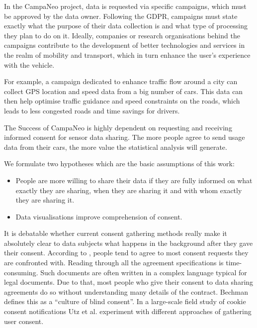 \documentclass[../paper.tex]{subfiles}
\begin{document}
  In the CampaNeo project, data is requested via specific campaigns, which must be
  approved by the data owner. Following the GDPR, campaigns must state exactly
  what the purpose of their data collection is and what type of processing they
  plan to do on it. Ideally, companies or research organisations behind the
  campaigns contribute to the development of better technologies and services
  in the realm of mobility and transport, which in turn enhance the user’s
  experience with the vehicle.

  For example, a campaign dedicated to enhance traffic flow around a city can collect
  GPS location and speed data from a big number of cars. This data can then help
  optimise traffic guidance and speed constraints on the roads, which leads to less congested roads and
  time savings for drivers.
  
  The Success of CampaNeo is highly dependent on requesting and receiving informed
  consent for sensor data sharing. The more people agree to send usage data from
  their cars, the more value the statistical analysis will generate. 
  
  We
  formulate two hypotheses which are the basic assumptions of this work:
  
  \begin{itemize}
    \item People are more willing to share their data if they are fully informed
          on what exactly they are sharing, when they are sharing it and with
          whom exactly they are sharing it.
    \item Data visualisations improve comprehension of consent.
  \end{itemize}

  It is debatable whether current consent gathering methods really make it
  absolutely clear to data subjects what happens in the background after they
  gave their consent. According to \cite{Borgesisus_informed_consent_2015}, people
  tend to agree to most consent requests they are confronted with.
  Reading through all the agreement specifications is time-consuming. Such
  documents are often written in a complex language typical for legal documents.
  Due to that, most people who give their consent to data sharing agreements do so
  without understanding many details of the contract. Bechman \cite{Bechmann2014}
  defines this as a “culture of blind consent”.
  In a large-scale field study of cookie consent notifications Utz et al. \cite{Utz_2019} experiment with different approaches of gathering user consent.
  
\end{document}
